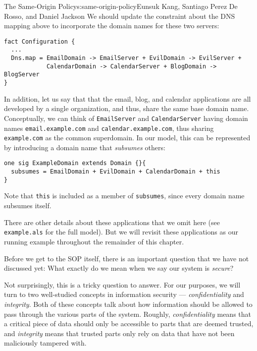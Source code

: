 \begin{aosachapter}{The Same-Origin Policy}{s:same-origin-policy}{Eunsuk Kang, Santiago Perez De Rosso, and Daniel Jackson}
We should update the constraint about the DNS mapping above to
incorporate the domain names for these two servers:

\begin{verbatim}
fact Configuration {
  ...
  Dns.map = EmailDomain -> EmailServer + EvilDomain -> EvilServer + 
            CalendarDomain -> CalendarServer + BlogDomain -> BlogServer  
}
\end{verbatim}

In addition, let us say that that the email, blog, and calendar
applications are all developed by a single organization, and thus, share
the same base domain name. Conceptually, we can think of
\texttt{EmailServer} and \texttt{CalendarServer} having domain names
\texttt{email.example.com} and \texttt{calendar.example.com}, thus
sharing \texttt{example.com} as the common superdomain. In our model,
this can be represented by introducing a domain name that
\emph{subsumes} others:

\begin{verbatim}
one sig ExampleDomain extends Domain {}{
  subsumes = EmailDomain + EvilDomain + CalendarDomain + this
}   
\end{verbatim}

Note that \texttt{this} is included as a member of \texttt{subsumes},
since every domain name subsumes itself.

There are other details about these applications that we omit here (see
\texttt{example.als} for the full model). But we will revisit these
applications as our running example throughout the remainder of this
chapter.

\label{security-properties}

Before we get to the SOP itself, there is an important question that we
have not discussed yet: What exactly do we mean when we say our system
is \emph{secure}?

Not surprisingly, this is a tricky question to answer. For our purposes,
we will turn to two well-studied concepts in information security ---
\emph{confidentiality} and \emph{integrity}. Both of these concepts talk
about how information should be allowed to pass through the various
parts of the system. Roughly, \emph{confidentiality} means that a
critical piece of data should only be accessible to parts that are
deemed trusted, and \emph{integrity} means that trusted parts only rely
on data that have not been maliciously tampered with.

\label{dataflow-properties}


\end{aosachapter}
